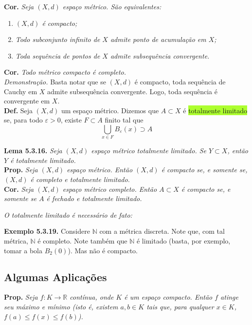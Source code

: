 \documentclass{article}
\begin{document}
\begin{landscape}
\begin{multicols}{3}
\textbf{Cor.} \textit{Seja $(X,d)$ espaço métrico. São equivalentes:}
\begin{enumerate}
    \item \textit{$(X,d)$ é compacto;}
    \item \textit{Todo subconjunto infinito de $X$ admite ponto de acumulação em $X$;}
    \item \textit{Toda sequência de pontos de $X$ admite subsequência convergente.}
\end{enumerate}
\textbf{Cor.} \textit{Todo métrico compacto é completo.}\\
\textit{Demonstração.} Basta notar que se $(X,d)$ é compacto, toda sequência de Cauchy em $X$ admite subsequência convergente. Logo, toda sequência é convergente em $X$.\\

\textbf{Def.} Seja $(X, d)$ um espaço métrico. Dizemos que $A \subset X$ é  \colorbox{GreenYellow}{totalmente limitado} se, para todo $\varepsilon > 0$, existe $F \subset A$ finito tal que
\[
\bigcup_{x \in F} B_\varepsilon(x) \supset A
\]

\textbf{Lema 5.3.16.} \textit{Seja $(X, d)$ espaço métrico totalmente limitado. Se $Y \subset X$, então $Y$ é totalmente limitado.}\\

\textbf{Prop.} \textit{Seja $(X, d)$ espaço métrico. Então $(X, d)$ é compacto se, e somente se, $(X, d)$ é completo e totalmente limitado.}\\

\textbf{Cor.} \textit{Seja $(X, d)$ espaço métrico completo. Então $A \subset X$ é compacto se, e somente se $A$ é fechado e totalmente limitado.}

\textit{O totalmente limitado é necessário de fato:}

\textbf{Exemplo 5.3.19.} Considere $\mathbb{N}$ com a métrica discreta. Note que, com tal métrica, $\mathbb{N}$ é completo. Note também que $\mathbb{N}$ é limitado (basta, por exemplo, tomar a bola $B_2(0)$). Mas não é compacto.

\subsection{Algumas Aplicações}

\textbf{Prop.} \textit{Seja $f : K \to \mathbb{R}$ contínua, onde $K$ é um espaço compacto. Então $f$ atinge seu máximo e mínimo (\textit{isto é}, existem $a, b \in K$ tais que, para qualquer $x \in K$, $f(a) \leq f(x) \leq f(b)$).}\\


\end{multicols}
\end{landscape}
\end{document}
